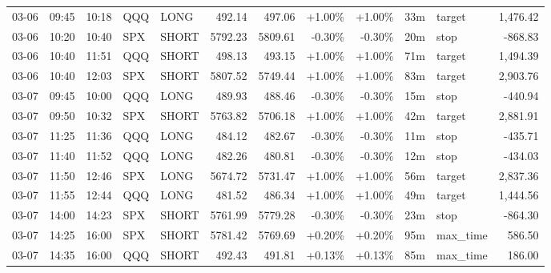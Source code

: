 \documentclass[11pt,a4paper,twoside]{article}
\begin{document}
\begin{center}
\begin{longtable}{>{\color{txtmain}}l l l l l r r r r r >{\color{txtmain}}l r}
03-06 & 09:45 & 10:18 & QQQ & LONG & 492.14 & 497.06 & \textcolor{wingreen}{+1.00\%} & \textcolor{wingreen}{+1.00\%} & 33m & target & \textcolor{wingreen}{1,476.42} \\
03-06 & 10:20 & 10:40 & SPX & SHORT & 5792.23 & 5809.61 & \textcolor{lossred}{-0.30\%} & \textcolor{lossred}{-0.30\%} & 20m & stop & \textcolor{lossred}{-868.83} \\
03-06 & 10:40 & 11:51 & QQQ & SHORT & 498.13 & 493.15 & \textcolor{wingreen}{+1.00\%} & \textcolor{wingreen}{+1.00\%} & 71m & target & \textcolor{wingreen}{1,494.39} \\
03-06 & 10:40 & 12:03 & SPX & SHORT & 5807.52 & 5749.44 & \textcolor{wingreen}{+1.00\%} & \textcolor{wingreen}{+1.00\%} & 83m & target & \textcolor{wingreen}{2,903.76} \\
03-07 & 09:45 & 10:00 & QQQ & LONG & 489.93 & 488.46 & \textcolor{lossred}{-0.30\%} & \textcolor{lossred}{-0.30\%} & 15m & stop & \textcolor{lossred}{-440.94} \\
03-07 & 09:50 & 10:32 & SPX & SHORT & 5763.82 & 5706.18 & \textcolor{wingreen}{+1.00\%} & \textcolor{wingreen}{+1.00\%} & 42m & target & \textcolor{wingreen}{2,881.91} \\
03-07 & 11:25 & 11:36 & QQQ & LONG & 484.12 & 482.67 & \textcolor{lossred}{-0.30\%} & \textcolor{lossred}{-0.30\%} & 11m & stop & \textcolor{lossred}{-435.71} \\
03-07 & 11:40 & 11:52 & QQQ & LONG & 482.26 & 480.81 & \textcolor{lossred}{-0.30\%} & \textcolor{lossred}{-0.30\%} & 12m & stop & \textcolor{lossred}{-434.03} \\
03-07 & 11:50 & 12:46 & SPX & LONG & 5674.72 & 5731.47 & \textcolor{wingreen}{+1.00\%} & \textcolor{wingreen}{+1.00\%} & 56m & target & \textcolor{wingreen}{2,837.36} \\
03-07 & 11:55 & 12:44 & QQQ & LONG & 481.52 & 486.34 & \textcolor{wingreen}{+1.00\%} & \textcolor{wingreen}{+1.00\%} & 49m & target & \textcolor{wingreen}{1,444.56} \\
03-07 & 14:00 & 14:23 & SPX & SHORT & 5761.99 & 5779.28 & \textcolor{lossred}{-0.30\%} & \textcolor{lossred}{-0.30\%} & 23m & stop & \textcolor{lossred}{-864.30} \\
03-07 & 14:25 & 16:00 & SPX & SHORT & 5781.42 & 5769.69 & \textcolor{wingreen}{+0.20\%} & \textcolor{wingreen}{+0.20\%} & 95m & max\_time & \textcolor{wingreen}{586.50} \\
03-07 & 14:35 & 16:00 & QQQ & SHORT & 492.43 & 491.81 & \textcolor{wingreen}{+0.13\%} & \textcolor{wingreen}{+0.13\%} & 85m & max\_time & \textcolor{wingreen}{186.00} \\

\end{longtable}
\end{center}
\end{document}
